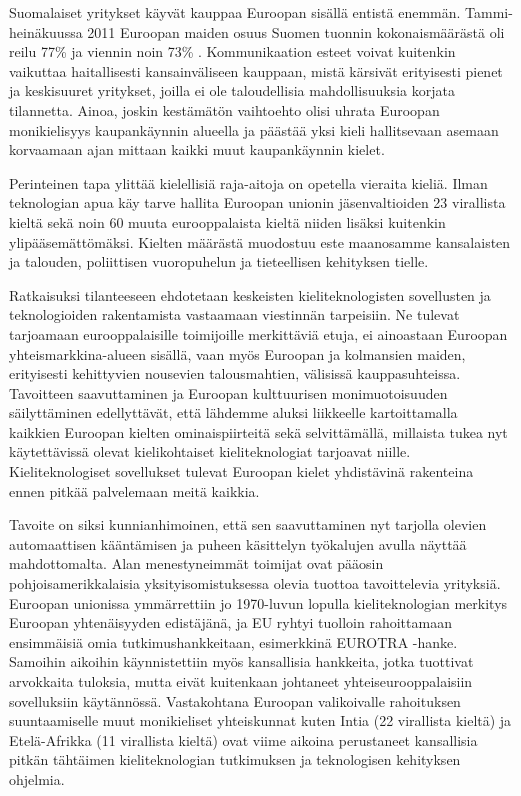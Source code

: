 \documentclass[]{../../metanetpaper}
\begin{document}
\begin{Parallel}[c]{77mm}{77mm}
{Suomalaiset yritykset käyvät kauppaa Euroopan sisällä entistä enemmän.
Tammi-heinäkuussa 2011 Euroopan maiden osuus Suomen tuonnin
kokonaismäärästä oli reilu 77\% ja viennin noin 73\% \cite{SVT}.
Kommunikaation esteet voivat kuitenkin vaikuttaa haitallisesti
kansainväliseen kauppaan, mistä kärsivät erityisesti pienet ja
keskisuuret yritykset, joilla ei ole taloudellisia mahdollisuuksia
korjata tilannetta. Ainoa, joskin kestämätön vaihtoehto olisi uhrata
Euroopan monikielisyys kaupankäynnin alueella ja päästää yksi kieli
hallitsevaan asemaan korvaamaan ajan mittaan kaikki muut kaupankäynnin
kielet.

Perinteinen tapa ylittää kielellisiä raja-aitoja on opetella vieraita
kieliä.  Ilman teknologian apua käy tarve hallita Euroopan unionin
jäsenvaltioiden 23 virallista kieltä sekä noin 60 muuta eurooppalaista
kieltä niiden lisäksi kuitenkin ylipääsemättömäksi. Kielten määrästä
muodostuu este maanosamme kansalaisten ja talouden, poliittisen
vuoropuhelun ja tieteellisen kehityksen tielle.

Ratkaisuksi tilanteeseen ehdotetaan keskeisten kieliteknologisten
sovellusten ja teknologioiden rakentamista vastaamaan viestinnän
tarpeisiin. Ne tulevat tarjoamaan eurooppalaisille toimijoille
merkittäviä etuja, ei ainoastaan Euroopan yhteismarkkina-alueen
sisällä, vaan myös Euroopan ja kolmansien maiden, erityisesti
kehittyvien nousevien talousmahtien, välisissä
kauppasuhteissa. Tavoitteen saavuttaminen ja Euroopan kulttuurisen
monimuotoisuuden säilyttäminen edellyttävät, että lähdemme aluksi
liikkeelle kartoittamalla kaikkien Euroopan kielten ominaispiirteitä
sekä selvittämällä, millaista tukea nyt käytettävissä olevat
kielikohtaiset kieliteknologiat tarjoavat niille. Kieliteknologiset
sovellukset tulevat Euroopan kielet yhdistävinä rakenteina ennen
pitkää palvelemaan meitä kaikkia.


Tavoite on siksi kunnianhimoinen, että sen saavuttaminen nyt tarjolla olevien
automaattisen kääntämisen ja puheen käsittelyn työkalujen avulla näyttää
mahdottomalta. Alan menestyneimmät toimijat ovat pääosin pohjoisamerikkalaisia
yksityisomistuksessa olevia tuottoa tavoittelevia yrityksiä. Euroopan unionissa
ymmärrettiin jo 1970-luvun lopulla kieliteknologian merkitys Euroopan
yhtenäisyyden edistäjänä, ja EU ryhtyi tuolloin rahoittamaan ensimmäisiä omia
tutkimushankkeitaan, esimerkkinä EUROTRA -hanke. Samoihin aikoihin
käynnistettiin myös kansallisia hankkeita, jotka tuottivat arvokkaita tuloksia,
mutta eivät kuitenkaan johtaneet yhteiseurooppalaisiin sovelluksiin
käytännössä. Vastakohtana Euroopan valikoivalle rahoituksen suuntaamiselle muut
monikieliset yhteiskunnat kuten Intia (22 virallista kieltä) ja Etelä-Afrikka
(11 virallista kieltä) ovat viime aikoina perustaneet kansallisia pitkän
tähtäimen kieliteknologian tutkimuksen ja teknologisen kehityksen ohjelmia.

}
\end{Parallel}
\end{document}
